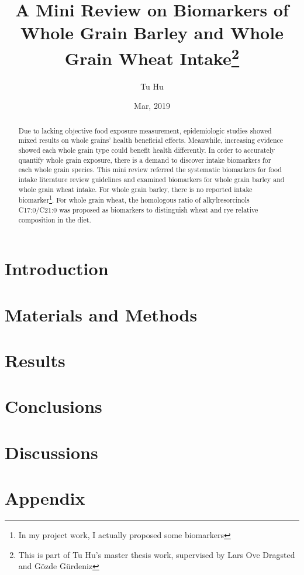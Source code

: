 \documentclass[]{article}
\title{A Mini Review on Biomarkers of Whole Grain Barley and Whole Grain Wheat Intake\footnote{This is part of Tu Hu's master thesis work, supervised by Lars Ove Dragsted and Gözde Gürdeniz}}
\author{Tu Hu}
\date{Mar, 2019}
\begin{document}
\maketitle

\begin{abstract}
Due to lacking objective food exposure measurement, epidemiologic studies showed mixed results on whole grains' health beneficial effects.
Meanwhile, increasing evidence showed each whole grain type could benefit health differently. 
In order to accurately quantify whole grain exposure, there is a demand to discover intake biomarkers for each whole grain species.
This mini review referred the systematic biomarkers for food intake literature review guidelines and examined biomarkers for whole grain barley and whole grain wheat intake.
For whole grain barley, there is no reported intake biomarker\footnote{In my project work, I actually proposed some biomarkers}.
For whole grain wheat, the homologous ratio of alkylresorcinols C17:0/C21:0 was proposed as biomarkers to distinguish wheat and rye relative composition in the diet.

\end{abstract}

\section{Introduction}


\section{Materials and Methods}


\section{Results}


\section{Conclusions}

\section{Discussions}


\section{Appendix}


\clearpage
\printbibliography[
heading=bibintoc,
title={References}
]
\end{document}
